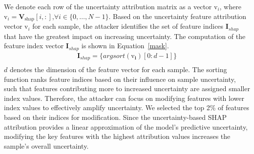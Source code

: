 We denote each row of the uncertainty attribution matrix as a vector $\bm{\mathrm{v}}_{i}$, where $\bm{\mathrm{v}}_{i} =\bm{V}_{\text{shap}}[i,:]$,$\forall i \in \{0, \dots, N-1 \}$.
Based on the uncertainty feature attribution vector $\bm{\mathrm{v}}_{i}$ for each sample, the attacker identifies the set of feature indices $\bm{I}_{shap}$ that have the greatest impact on increasing uncertainty.
The computation of the feature index vector $\bm{I}_{shap}$ is shown in Equation~\ref{mask}.
\begin{equation}
	\begin{aligned}
		\bm{I}_{shap} = \{ argsort(\bm{\mathrm{v}_{i}})[0:d-1]  \} \\
		\end{aligned}
	\label{mask}
\end{equation}
$d$ denotes the dimension of the feature vector for each sample.
The sorting function ranks feature indices based on their influence on sample uncertainty, such that features contributing more to increased uncertainty are assigned smaller index values.  
Therefore, the attacker can focus on modifying features with lower index values to effectively amplify uncertainty.
We selected the top 2\% of features based on their indices for modification.
Since the uncertainty-based SHAP attribution provides a linear approximation of the model's predictive uncertainty, modifying the key features with the highest attribution values increases the sample's overall uncertainty.

